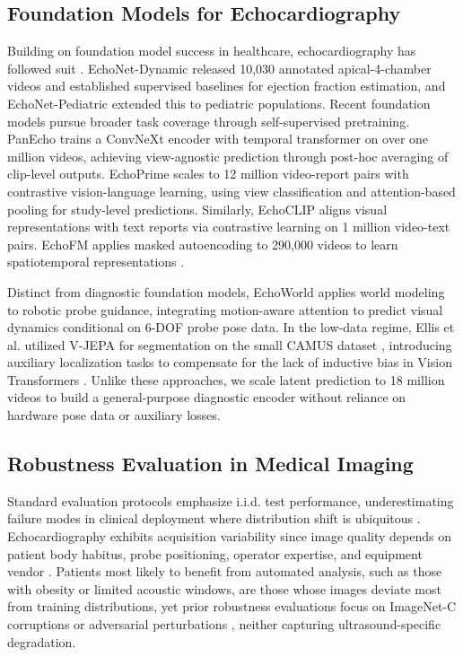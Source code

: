 \documentclass{article}
\theoremstyle{plain}
\theoremstyle{definition}
\theoremstyle{remark}
\begin{document}
\subsection{Foundation Models for Echocardiography}
\label{sec:related:echo}
Building on foundation model success in healthcare, echocardiography has followed suit \citep{medsam,medsam2,fallahpour2024ehrmambageneralizablescalablefoundation}. EchoNet-Dynamic \cite{echonet} released 10,030 annotated apical-4-chamber videos and established supervised baselines for ejection fraction estimation, and EchoNet-Pediatric \cite{echonet_pediatric} extended this to pediatric populations. Recent foundation models pursue broader task coverage through self-supervised pretraining. PanEcho \cite{panecho} trains a ConvNeXt encoder with temporal transformer on over one million videos, achieving view-agnostic prediction through post-hoc averaging of clip-level outputs. EchoPrime \cite{echoprime} scales to 12 million video-report pairs with contrastive vision-language learning, using view classification and attention-based pooling for study-level predictions. Similarly, EchoCLIP \citep{echoclip} aligns visual representations with text reports via contrastive learning on 1 million video-text pairs. EchoFM applies masked autoencoding to 290,000 videos to learn spatiotemporal representations \citep{kim2025echofmfoundationmodelgeneralizable}.

Distinct from diagnostic foundation models, EchoWorld \cite{echoworld} applies world modeling to robotic probe guidance, integrating motion-aware attention to predict visual dynamics conditional on 6-DOF probe pose data. In the low-data regime, Ellis et al. \cite{ellis2025} utilized V-JEPA for segmentation on the small CAMUS dataset \citep{Leclerc_2019}, introducing auxiliary localization tasks to compensate for the lack of inductive bias in Vision Transformers \citep{dosovitskiy2021imageworth16x16words}. Unlike these approaches, we scale latent prediction to 18 million videos to build a general-purpose diagnostic encoder without reliance on hardware pose data or auxiliary losses.

\subsection{Robustness Evaluation in Medical Imaging}
\label{sec:related:robust}
Standard evaluation protocols emphasize i.i.d. test performance, underestimating failure modes in clinical deployment where distribution shift is ubiquitous \cite{medical_domain_shift}. Echocardiography exhibits acquisition variability since image quality depends on patient body habitus, probe positioning, operator expertise, and equipment vendor \cite{echo_variability}. Patients most likely to benefit from automated analysis, such as those with obesity or limited acoustic windows, are those whose images deviate most from training distributions, yet prior robustness evaluations focus on ImageNet-C corruptions \cite{imagenetc} or adversarial perturbations \cite{medical_adversarial}, neither capturing ultrasound-specific degradation.
\end{document}
